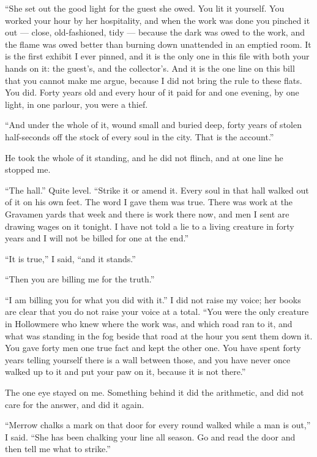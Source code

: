 ``She set out the good light for the guest she owed. You lit it yourself. You worked your hour by her hospitality, and when the work was done you pinched it out --- close, old-fashioned, tidy --- because the dark was owed to the work, and the flame was owed better than burning down unattended in an emptied room. It is the first exhibit I ever pinned, and it is the only one in this file with both your hands on it: the guest's, and the collector's. And it is the one line on this bill that you cannot make me argue, because I did not bring the rule to these flats. You did. Forty years old and every hour of it paid for and one evening, by one light, in one parlour, you were a thief.

``And under the whole of it, wound small and buried deep, forty years of stolen half-seconds off the stock of every soul in the city. That is the account.''

He took the whole of it standing, and he did not flinch, and at one line he stopped me.

``The hall.'' Quite level. ``Strike it or amend it. Every soul in that hall walked out of it on his own feet. The word I gave them was true. There was work at the Gravamen yards that week and there is work there now, and men I sent are drawing wages on it tonight. I have not told a lie to a living creature in forty years and I will not be billed for one at the end.''

``It is true,'' I said, ``and it stands.''

``Then you are billing me for the truth.''

``I am billing you for what you did with it.'' I did not raise my voice; her books are clear that you do not raise your voice at a total. ``You were the only creature in Hollowmere who knew where the work was, and which road ran to it, and what was standing in the fog beside that road at the hour you sent them down it. You gave forty men one true fact and kept the other one. You have spent forty years telling yourself there is a wall between those, and you have never once walked up to it and put your paw on it, because it is not there.''

The one eye stayed on me. Something behind it did the arithmetic, and did not care for the answer, and did it again.

``Merrow chalks a mark on that door for every round walked while a man is out,'' I said. ``She has been chalking your line all season. Go and read the door and then tell me what to strike.''

